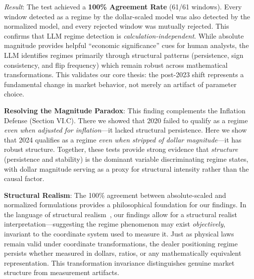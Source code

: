 \vspace{0.2cm}

\noindent\textit{Result}: The test achieved a \textbf{100\% Agreement Rate} (61/61 windows). Every window detected as a regime by the dollar-scaled model was also detected by the normalized model, and every rejected window was mutually rejected. This confirms that LLM regime detection is \textit{calculation-independent}. While absolute magnitude provides helpful ``economic significance'' cues for human analysts, the LLM identifies regimes primarily through structural patterns (persistence, sign consistency, and flip frequency) which remain robust across mathematical transformations. This validates our core thesis: the post-2023 shift represents a fundamental change in market behavior, not merely an artifact of parameter choice.

\vspace{0.2cm}

\noindent\textbf{Resolving the Magnitude Paradox}: This finding complements the Inflation Defense (Section VI.C). There we showed that 2020 failed to qualify as a regime \textit{even when adjusted for inflation}---it lacked structural persistence. Here we show that 2024 qualifies as a regime \textit{even when stripped of dollar magnitude}---it has robust structure. Together, these tests provide strong evidence that \textit{structure} (persistence and stability) is the dominant variable discriminating regime states, with dollar magnitude serving as a proxy for structural intensity rather than the causal factor.

\vspace{0.2cm}

\noindent\textbf{Structural Realism}: The 100\% agreement between absolute-scaled and normalized formulations provides a philosophical foundation for our findings. In the language of structural realism~\cite{worrall1989structural}, our findings allow for a structural realist interpretation---suggesting the regime phenomenon may exist \textit{objectively}, invariant to the coordinate system used to measure it. Just as physical laws remain valid under coordinate transformations, the dealer positioning regime persists whether measured in dollars, ratios, or any mathematically equivalent representation. This transformation invariance distinguishes genuine market structure from measurement artifacts.

\vspace{0.2cm}

